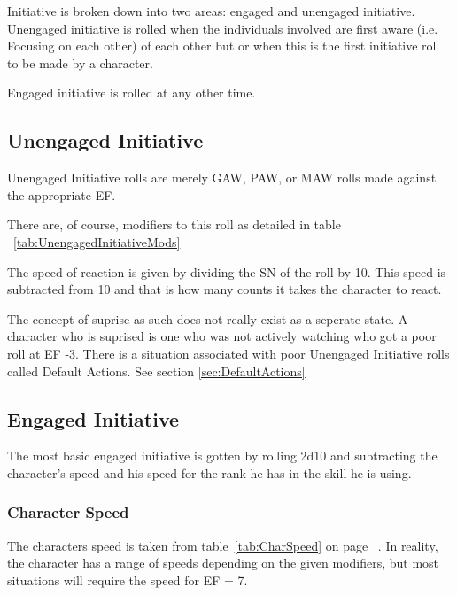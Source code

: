 Initiative is broken down into two areas: engaged and unengaged 
initiative. Unengaged initiative is rolled when the individuals 
involved are first aware (i.e. Focusing on each other) of each other but or
when this is the first initiative roll to be made by a character. 

Engaged initiative is rolled at any other time.

\subsection{Unengaged Initiative}

Unengaged Initiative rolls are merely GAW, PAW, or MAW rolls made 
against the appropriate EF. 

There are, of course, modifiers to this roll as detailed in table 
~\ref{tab:UnengagedInitiativeMods}

The speed of reaction is given by dividing the SN of the roll by 10.
This speed is subtracted from 10 and that is how many counts it takes 
the character to react.



The concept of suprise as such does not really exist as a seperate 
state. A character who is suprised is one who was not actively 
watching who got a poor roll at EF -3. There is a situation associated 
with poor Unengaged Initiative rolls called Default Actions. See 
section \ref{sec:DefaultActions}

\subsection{Engaged Initiative}

The most basic engaged initiative is gotten by rolling 2d10 and 
subtracting the character's speed and his speed for the rank he has 
in the skill he is using.

\subsubsection{Character Speed}

The characters speed is taken from table~\ref{tab:CharSpeed} on page~\pageref{tab:CharSpeed}
. In reality, the character has a range of speeds depending on the 
given modifiers, but most situations will require the speed for EF =
7.

